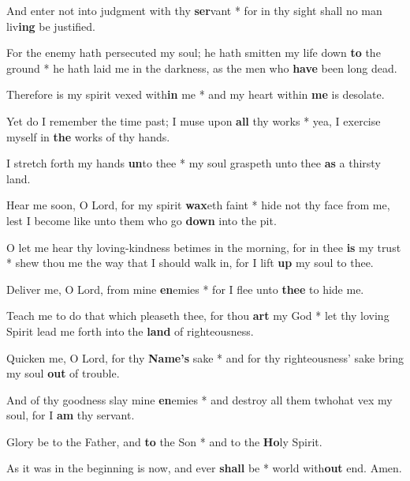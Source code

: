 \begin{multicols}{2}
	And enter not into judgment with thy \textbf{ser}vant * for in thy sight shall no man liv\textbf{ing} be justified.
	
	For the enemy hath persecuted my soul; he hath smitten my life down \textbf{to} the ground * he hath laid me in the darkness, as the men who \textbf{have} been long dead.
	
	Therefore is my spirit vexed with\textbf{in} me * and my heart within \textbf{me} is desolate.
	
	Yet do I remember the time past; I muse upon \textbf{all} thy works * yea, I exercise myself in \textbf{the} works of thy hands.
	
	I stretch forth my hands \textbf{un}to thee * my soul graspeth unto thee \textbf{as} a thirsty land.
	
	Hear me soon, O Lord, for my spirit \textbf{wax}eth faint * hide not thy face from me, lest I become like unto them who go \textbf{down} into the pit.
	
	O let me hear thy loving-kindness betimes in the morning, for in thee \textbf{is} my trust * shew thou me the way that I should walk in, for I lift \textbf{up} my soul to thee.
	
	Deliver me, O Lord, from mine \textbf{en}emies * for I flee unto \textbf{thee} to hide me.
	
	Teach me to do that which pleaseth thee, for thou \textbf{art} my God * let thy loving Spirit lead me forth into the \textbf{land} of righteousness.
	
	Quicken me, O Lord, for thy \textbf{Name's} sake * and for thy righteousness' sake bring my soul \textbf{out} of trouble.
	
	And of thy goodness slay mine \textbf{en}emies * and destroy all them twhohat vex my soul, for I \textbf{am} thy servant.
	
	Glory be to the Father, and \textbf{to} the Son * and to the \textbf{Ho}ly Spirit.
	
	As it was in the beginning is now, and ever \textbf{shall} be * world with\textbf{out} end. Amen.
\end{multicols}